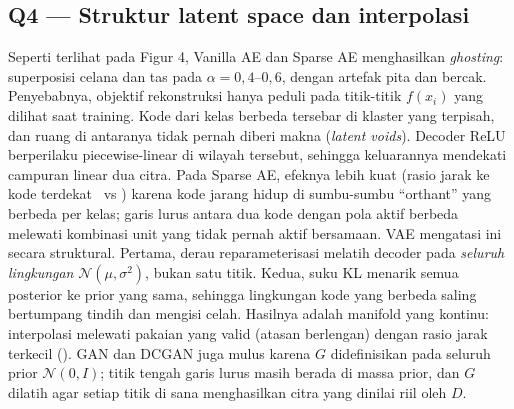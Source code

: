 \subsection*{Q4 --- Struktur latent space dan interpolasi}
Seperti terlihat pada Figur 4, Vanilla AE dan Sparse AE menghasilkan \emph{ghosting}: superposisi celana dan tas
pada $\alpha=0{,}4$--$0{,}6$, dengan artefak pita dan bercak. Penyebabnya, objektif rekonstruksi hanya peduli pada titik-titik
$f(x_i)$ yang dilihat saat training. Kode dari kelas berbeda tersebar di klaster yang terpisah, dan ruang di antaranya tidak pernah
diberi makna (\emph{latent voids}). Decoder ReLU berperilaku piecewise-linear di wilayah tersebut, sehingga keluarannya mendekati
campuran linear dua citra. Pada Sparse AE, efeknya lebih kuat (rasio jarak ke kode terdekat \VOIDSAE\ vs \VOIDAE) karena kode jarang
hidup di sumbu-sumbu ``orthant'' yang berbeda per kelas; garis lurus antara dua kode dengan pola aktif berbeda melewati kombinasi unit
yang tidak pernah aktif bersamaan. VAE mengatasi ini secara struktural. Pertama, derau reparameterisasi melatih decoder pada
\emph{seluruh lingkungan} $\mathcal{N}(\mu,\sigma^2)$, bukan satu titik. Kedua, suku KL menarik semua posterior ke prior yang sama,
sehingga lingkungan kode yang berbeda saling bertumpang tindih dan mengisi celah. Hasilnya adalah manifold yang kontinu:
interpolasi melewati pakaian yang valid (atasan berlengan) dengan rasio jarak terkecil (\VOIDVAE). GAN dan DCGAN juga mulus
karena $G$ didefinisikan pada seluruh prior $\mathcal{N}(0,I)$; titik tengah garis lurus masih berada di massa prior, dan $G$ dilatih
agar setiap titik di sana menghasilkan citra yang dinilai riil oleh $D$.

